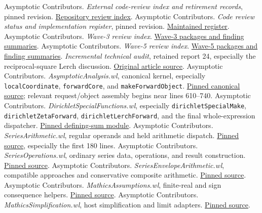 \documentclass[11pt,letterpaper]{article}
\newcommand{\code}[1]{\nolinkurl{#1}}
\newcommand{\src}[2]{\href{https://github.com/VladimirReshetnikov/Asymptotic/blob/8cee870994f506b501bae3ea6bd4a3a7edb895c1/#1}{#2}}
\begin{document}
\begin{thebibliography}{99}
\small\setlength{\itemsep}{2pt}\setlength{\parskip}{0pt}
 Asymptotic Contributors. \emph{External code-review index and retirement records}, pinned revision. \src{external-reports/code-review/README.md}{Repository review index}.
 Asymptotic Contributors. \emph{Code review status and implementation register}, pinned revision. \src{docs/development/CODE_REVIEW_STATUS.md}{Maintained register}.
 Asymptotic Contributors. \emph{Wave-3 review index}. \src{external-reports/code-review/wave-3/README.md}{Wave-3 packages and finding summaries}.
 Asymptotic Contributors. \emph{Wave-5 review index}. \src{external-reports/code-review/wave-5/README.md}{Wave-5 packages and finding summaries}.
 \emph{Incremental technical audit}, retained report 24, especially the reciprocal-square Lerch discussion. \src{external-reports/code-review/wave-3/code-review-24/article/audit.tex}{Original article source}.
 Asymptotic Contributors. \emph{AsymptoticAnalysis.wl}, canonical kernel, especially \code{localCoordinate}, \code{forwardCore}, and \code{makeForwardObject}. \src{src/Kernel/AsymptoticAnalysis.wl}{Pinned canonical source}; relevant request/object assembly begins near lines 610--740.
 Asymptotic Contributors. \emph{DirichletSpecialFunctions.wl}, especially \code{dirichletSpecialMake}, \code{dirichletZetaForward}, \code{dirichletLerchForward}, and the final whole-expression dispatcher. \src{src/Kernel/DirichletSpecialFunctions.wl}{Pinned defining-sum module}.
 Asymptotic Contributors. \emph{SeriesArithmetic.wl}, regular operands and held arithmetic dispatch. \src{src/Kernel/SeriesArithmetic.wl}{Pinned source}, especially the first 180 lines.
 Asymptotic Contributors. \emph{SeriesOperations.wl}, ordinary series data, operations, and result construction. \src{src/Kernel/SeriesOperations.wl}{Pinned source}.
 Asymptotic Contributors. \emph{SeriesEnvelopeArithmetic.wl}, compatible approaches and conservative composite arithmetic. \src{src/Kernel/SeriesEnvelopeArithmetic.wl}{Pinned source}.
 Asymptotic Contributors. \emph{MathicsAssumptions.wl}, finite-real and sign consequence helpers. \src{src/Kernel/MathicsAssumptions.wl}{Pinned source}.
 Asymptotic Contributors. \emph{MathicsSimplification.wl}, host simplification and limit adapters. \src{src/Kernel/MathicsSimplification.wl}{Pinned source}.

\end{thebibliography}
\end{document}
